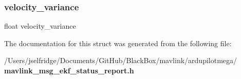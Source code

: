 \mbox{\label{struct____mavlink__ekf__status__report__t_a81e209b4ea4d5af041d32fcae6d73b66}} 
\subsubsection{velocity\+\_\+variance}
{\footnotesize\ttfamily float velocity\+\_\+variance}



The documentation for this struct was generated from the following file\+:\begin{DoxyCompactItemize}
\item 
/\+Users/jselfridge/\+Documents/\+Git\+Hub/\+Black\+Box/mavlink/ardupilotmega/\textbf{ mavlink\+\_\+msg\+\_\+ekf\+\_\+status\+\_\+report.\+h}\end{DoxyCompactItemize}
